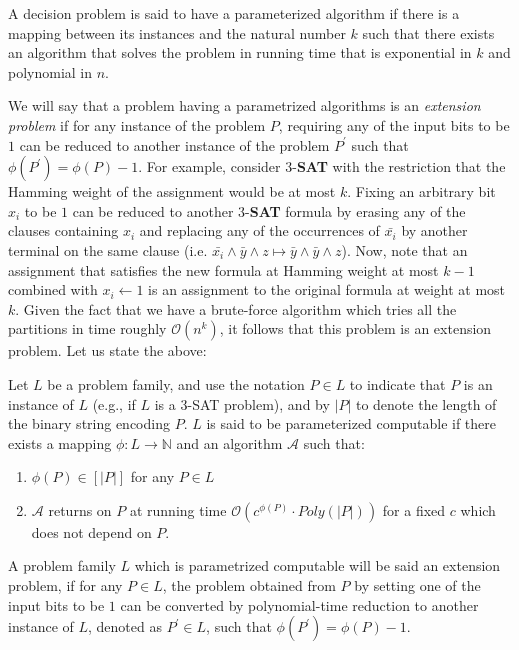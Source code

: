 \documentclass[manuscript,screen,review]{acmart}
\begin{document}
A decision problem is said to have a parameterized algorithm if there is a mapping between its instances and the natural number $k$ such that there exists an algorithm that solves the problem in running time that is exponential in $k$ and polynomial in $n$. 

We will say that a problem having a parametrized algorithms is an \emph{extension problem} if for any instance of the problem $P$, requiring any of the input bits to be $1$ can be reduced to another instance of the problem $P^{\prime}$ such that $\phi\left( P^{\prime} \right) = \phi\left( P \right) - 1$. For example, consider $3$-\textbf{SAT} with the restriction that the Hamming weight of the assignment would be at most $k$. Fixing an arbitrary bit $x_{i}$ to be $1$ can be reduced to another $3$-\textbf{SAT} formula by erasing any of the clauses containing $x_{i}$ and replacing any of the occurrences of $\bar{x_{i}}$ by another terminal on the same clause (i.e. $ \bar{x_{i}} \wedge  \bar{y} \wedge z  \mapsto  \bar{y} \wedge \bar{y} \wedge z$). Now, note that an assignment that satisfies the new formula at Hamming weight at most $k-1$ combined with $x_{i} \leftarrow 1$ is an assignment to the original formula at weight at most $k$. Given the fact that we have a brute-force algorithm which tries all the partitions in time roughly $\mathcal{O}\left( n^{k} \right)$, it follows that this problem is an extension problem. Let us state the above:

\begin{definition} 
Let $L$ be a problem family, and use the notation $P \in L$ to indicate that $P$ is an instance of $L$ (e.g., if $L$ is a $3$-SAT problem), and by $|P|$ to denote the length of the binary string encoding $P$. $L$ is said to be parameterized computable if there exists a mapping $\phi : L \rightarrow \mathbb{N}$ and an algorithm $\mathcal{A}$ such that:

  \begin{enumerate}
    \item $\phi(P) \in [|P|]$ for any $P\in L$
    \item $\mathcal{A}$ returns on $P$ at running time $\mathcal{O}\left(c^{\phi(P)} \cdot Poly(|P|) \right)$ for a fixed $c$ which does not depend on $P$.
  \end{enumerate}
\end{definition}

\begin{definition}
A problem family $L$ which is parametrized computable will be said an extension problem, if for any $P \in L$, the problem obtained from $P$ by setting one of the input bits to be $1$ can be converted by polynomial-time reduction to another instance of $L$, denoted as $P^{\prime} \in L$, such that $\phi\left( P^{\prime} \right) = \phi\left( P \right) -1$.
\end{definition}
\end{document}
